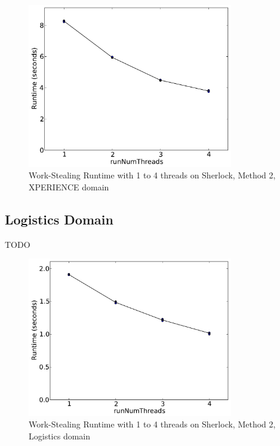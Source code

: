 \documentclass[12pt,twoside,abbrevs,msc,ai,notimes,logo,sansheadings]{infthesis}
\begin{document}
  \begin{figure}[!htbp]
  \begin{centering}
  \includegraphics[width=0.8\textwidth]{images/threads-xper5-sherlock-2-1}
  \par\end{centering}
  \caption{Work-Stealing Runtime with 1 to 4 threads on Sherlock, Method 2, XPERIENCE domain}
  \end{figure}
  
  \subsection{Logistics Domain}
  TODO
  
  \begin{figure}[!htbp]
  \begin{centering}
  \includegraphics[width=0.8\textwidth]{images/threads-log3-sherlock-2-1}
  \par\end{centering}
  \caption{Work-Stealing Runtime with 1 to 4 threads on Sherlock, Method 2, Logistics domain}
  \end{figure}
\end{document}
